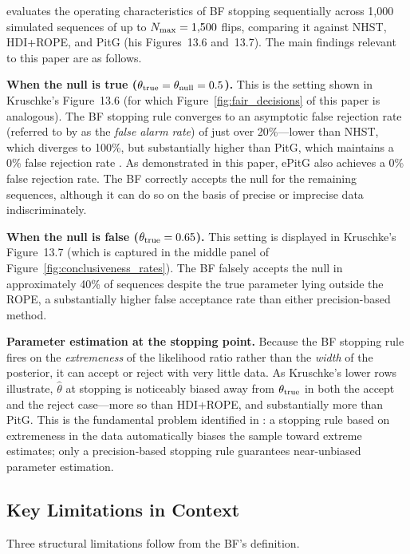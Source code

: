 \citet{kruschke2015doing} evaluates the operating characteristics of BF stopping
sequentially across 1{,}000 simulated sequences of up to $N_{\rm max}=1{,}500$ flips,
comparing it against NHST, HDI+ROPE, and PitG (his Figures~13.6 and~13.7).
The main findings relevant to this paper are as follows.

\textbf{When the null is true ($\theta_{\rm true}=\theta_{\rm null}=0.5$).}
This is the setting shown in Kruschke's Figure~13.6 (for which  Figure~\ref{fig:fair_decisions} of this paper is analogous). 
The BF stopping rule converges to an asymptotic false rejection rate
(referred to by \citeauthor{kruschke2015doing} as the \textit{false alarm rate})
of just over 20\%---lower than NHST, which diverges to 100\%, but substantially higher
than PitG, which maintains a 0\% false rejection rate \citep{kruschke2015doing}.
As demonstrated in this paper, ePitG also achieves a 0\% false rejection rate.
The BF correctly accepts the null for the remaining sequences, although it can do
so on the basis of precise or imprecise data indiscriminately.

\textbf{When the null is false ($\theta_{\rm true}=0.65$).}
This setting is displayed in Kruschke's Figure~13.7 (which is captured in the middle
panel of Figure~\ref{fig:conclusiveness_rates}). 
The BF falsely accepts the null in approximately
40\% of sequences despite the true parameter lying outside the ROPE, a substantially
higher false acceptance rate than either precision-based method.

\textbf{Parameter estimation at the stopping point.}
Because the BF stopping rule fires on the \emph{extremeness} of the likelihood ratio
rather than the \emph{width} of the posterior, it can accept or reject with very little
data.  As Kruschke's lower rows illustrate, $\hat{\theta}$ at stopping is noticeably
biased away from $\theta_{\rm true}$ in both the accept and the reject case---more so
than HDI+ROPE, and substantially more than PitG.  This is the fundamental problem
identified in \citet{kruschke2015doing}: a stopping rule based on extremeness in the data
automatically biases the sample toward extreme estimates; only a precision-based stopping
rule guarantees near-unbiased parameter estimation.

\subsection*{Key Limitations in Context}

Three structural limitations follow from the BF's definition.

